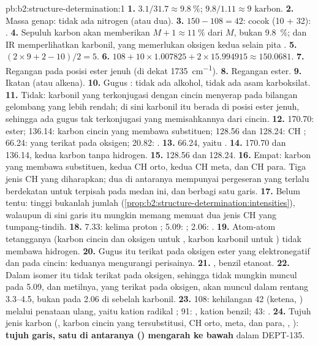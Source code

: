 \begin{solution}{pb:b2:structure-determination:1}
\textbf{1.} $3.1/31.7 \approx 9.8~\%$; $9.8/1.11 \approx 9$ karbon.
\textbf{2.} Massa genap: tidak ada nitrogen (atau dua).
\textbf{3.} $150 - 108 = 42$:  cocok (10 + 32): .
\textbf{4.} Sepuluh karbon akan memberikan $M+1 \approx 11~\%$ dari $M$,
bukan 9.8~\%; dan IR memperlihatkan karbonil, yang memerlukan oksigen kedua
selain pita .
\textbf{5.} $(2 \times 9 + 2 - 10)/2 = 5$.
\textbf{6.} $108 + 10 \times 1.007825 + 2 \times 15.994915 \approx 150.0681$.
\textbf{7.} Regangan  pada posisi ester jenuh (di dekat \qty{1735}{cm^{-1}}).
\textbf{8.} Regangan  ester.
\textbf{9.} Ikatan   (atau alkena).
\textbf{10.} Gugus : tidak ada alkohol, tidak ada asam karboksilat.
\textbf{11.} Tidak: karbonil yang terkonjugasi dengan cincin menyerap pada
bilangan gelombang yang lebih rendah; di sini karbonil itu berada di posisi
ester jenuh, sehingga ada gugus tak terkonjugasi yang memisahkannya dari
cincin.
\textbf{12.} 170.70:  ester; 136.14: karbon cincin yang membawa
substituen; 128.56 dan 128.24: CH ; 66.24:  yang terikat
pada oksigen; 20.82: .
\textbf{13.} 66.24, yaitu .
\textbf{14.} 170.70 dan 136.14, kedua karbon tanpa hidrogen.
\textbf{15.} 128.56 dan 128.24.
\textbf{16.} Empat: karbon yang membawa substituen, kedua CH orto, kedua CH
meta, dan CH para. Tiga jenis CH yang diharapkan; dua di antaranya
mempunyai pergeseran yang terlalu berdekatan untuk terpisah pada medan ini,
dan berbagi satu garis.
\textbf{17.} Belum tentu: tinggi bukanlah jumlah (\cref{prop:b2:structure-determination:intensities}),
walaupun di sini garis itu mungkin memang memuat dua jenis CH yang tumpang-tindih.
\textbf{18.} 7.33: kelima proton ; 5.09: ; 2.06: .
\textbf{19.} Atom-atom tetangganya (karbon cincin dan oksigen untuk ,
karbon karbonil untuk ) tidak membawa hidrogen.
\textbf{20.} Gugus itu terikat pada oksigen ester yang elektronegatif dan
pada cincin: keduanya mengurangi perisainya.
\textbf{21.} , benzil etanoat.
\textbf{22.} Dalam isomer itu  tidak terikat pada oksigen, sehingga
tidak mungkin muncul pada 5.09, dan metilnya, yang terikat pada oksigen,
akan muncul dalam rentang 3.3--4.5, bukan pada 2.06 di sebelah karbonil.
\textbf{23.} 108: kehilangan 42 (ketena, ) melalui penataan
ulang, yaitu kation radikal
; 91: , kation benzil; 43: .
\textbf{24.} Tujuh jenis karbon (, karbon cincin yang tersubstitusi,
CH orto, meta, dan para,
, ): \textbf{tujuh garis, satu di antaranya () mengarah ke bawah} dalam DEPT-135.
\end{solution}
